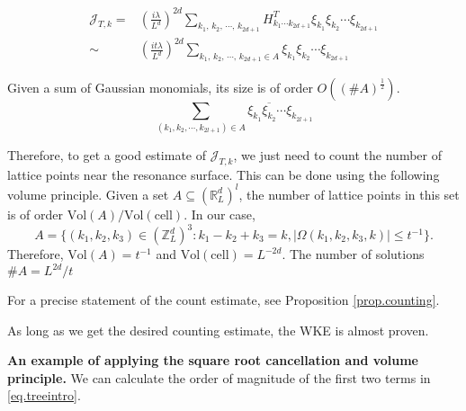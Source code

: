 \begin{equation}\label{eq.treeheuristic}
    \begin{split}
        \mathcal{J}_{T,k}=&\left(\frac{i\lambda}{L^{d}}\right)^{2d}\sum_{k_1,\, k_2,\, \cdots,\, k_{2d+1}} H^T_{k_1\cdots k_{2d+1}}  \xi_{k_1}\xi_{k_2}\cdots\xi_{k_{2d+1}} 
        \\
        \sim&  \left(\frac{it\lambda}{L^{d}}\right)^{2d}\sum_{k_1,\, k_2,\, \cdots,\, k_{2d+1}\in A}   \xi_{k_1}\xi_{k_2}\cdots\xi_{k_{2d+1}}
    \end{split}
\end{equation}

Given a sum of Gaussian monomials, its size is of order $O((\# A)^{\frac{1}{2}})$. 
    \begin{equation}
        \sum_{(k_1,k_2,\cdots,k_{2l+1}) \in A}\xi_{k_1} \overline{\xi_{k_2}}\cdots \xi_{k_{2l+1}}
    \end{equation}


Therefore, to get a good estimate of $\mathcal{J}_{T,k}$, we just need to count the number of lattice points near the resonance surface. This can be done using the following volume principle. Given a set $A\subseteq (\mathbb{R}^d_L)^{l}$, the number of lattice points in this set is of order $\text{Vol}(A)/\text{Vol}(\text{cell})$. In our case, 
    \begin{equation}
        A=\{(k_1,k_2,k_3) \in (\mathbb{Z}^d_L)^3: k_1 - k_2 + k_3 = k, |\Omega(k_1,k_2,k_3,k)|\le t^{-1}\}.
    \end{equation}
Therefore, $\text{Vol}(A) = t^{-1}$ and $\text{Vol}(\text{cell}) = L^{-2d}$. The number of solutions $\# A = L^{2d}/t$ 

For a precise statement of the count estimate, see Proposition \ref{prop.counting}.

As long as we get the desired counting estimate, the WKE is almost proven.

\textbf{An example of applying the square root cancellation and volume principle.} We can calculate the order of magnitude of the first two terms in \eqref{eq.treeintro}.

